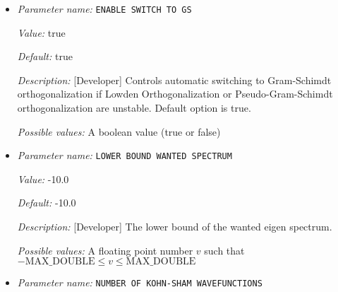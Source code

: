 \begin{itemize}
{\it Value:} 125


{\it Default:} 0


{\it Description:} [Developer] The degree of the Chebyshev polynomial to be employed for filtering out the unwanted spectrum. A heuristics value depending upon the upper bound of the eigen spectrum is used when the parameter value is 0, which is the default option.


{\it Possible values:} An integer $n$ such that $0\leq n \leq 2000$
\item {\it Parameter name:} {\tt ENABLE SWITCH TO GS}
\label{parameters:SCF parameters/Eigen_2dsolver_2fChebyshev solver related parameters/ENABLE SWITCH TO GS}
\label{parameters:SCF_20parameters/Eigen_2dsolver_2fChebyshev_20solver_20related_20parameters/ENABLE_20SWITCH_20TO_20GS}


{\it Value:} true


{\it Default:} true


{\it Description:} [Developer] Controls automatic switching to Gram-Schimdt orthogonalization if Lowden Orthogonalization or Pseudo-Gram-Schimdt orthogonalization are unstable. Default option is true.


{\it Possible values:} A boolean value (true or false)
\item {\it Parameter name:} {\tt LOWER BOUND WANTED SPECTRUM}
\label{parameters:SCF parameters/Eigen_2dsolver_2fChebyshev solver related parameters/LOWER BOUND WANTED SPECTRUM}
\label{parameters:SCF_20parameters/Eigen_2dsolver_2fChebyshev_20solver_20related_20parameters/LOWER_20BOUND_20WANTED_20SPECTRUM}


{\it Value:} -10.0


{\it Default:} -10.0


{\it Description:} [Developer] The lower bound of the wanted eigen spectrum.


{\it Possible values:} A floating point number $v$ such that $-\text{MAX\_DOUBLE} \leq v \leq \text{MAX\_DOUBLE}$
\item {\it Parameter name:} {\tt NUMBER OF KOHN-SHAM WAVEFUNCTIONS}
\label{parameters:SCF parameters/Eigen_2dsolver_2fChebyshev solver related parameters/NUMBER OF KOHN_2dSHAM WAVEFUNCTIONS}
\label{parameters:SCF_20parameters/Eigen_2dsolver_2fChebyshev_20solver_20related_20parameters/NUMBER_20OF_20KOHN_2dSHAM_20WAVEFUNCTIONS}



\end{itemize}
